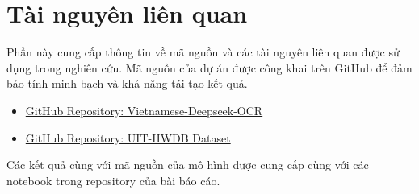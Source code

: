 \section{Tài nguyên liên quan}
Phần này cung cấp thông tin về mã nguồn và các tài nguyên liên quan được sử dụng trong nghiên cứu. Mã nguồn của dự án được công khai trên GitHub để đảm bảo tính minh bạch và khả năng tái tạo kết quả.

\begin{itemize}
    \item \href{https://github.com/p1neapplechoco/Vietnamese-Deepseek-OCR}{GitHub Repository: Vietnamese-Deepseek-OCR}
    \item \href{https://github.com/nghiangh/UIT-HWDB-dataset}{GitHub Repository: UIT-HWDB Dataset}
\end{itemize}

Các kết quả cùng với mã nguồn của mô hình được cung cấp cùng với các notebook trong repository của bài báo cáo.